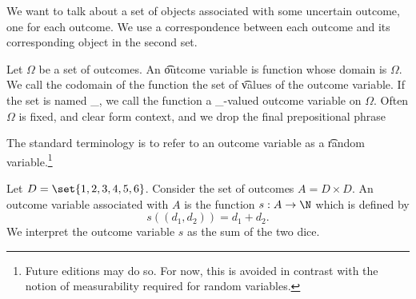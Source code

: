 

We want to talk about a set of objects associated with some uncertain outcome, one for each outcome.
We use a correspondence between each outcome and its corresponding object in the second set.


Let $\Omega$ be a set of outcomes.
An \t{outcome variable} is function whose domain is $\Omega$.
We call the codomain of the function the set of \t{values} of the outcome variable.
If the set is named \_, we call the function a \_-valued outcome variable on $\Omega$.
Often $\Omega$ is fixed, and clear form context, and we drop the final prepositional phrase 


The standard terminology is to refer to an outcome variable as a \t{random variable}.\footnote{Future editions may do so. For now, this is avoided in contrast with the notion of measurability required for random variables.}


Let $D = \set{1, 2, 3, 4, 5, 6}$.
Consider the set of outcomes $A = D \times D$.
An outcome variable associated with $A$ is the function $s: A \to \N$ which is defined by
\[
  s((d_1, d_2)) = d_1 + d_2.
\]
We interpret the outcome variable $s$ as the sum of the two dice.

